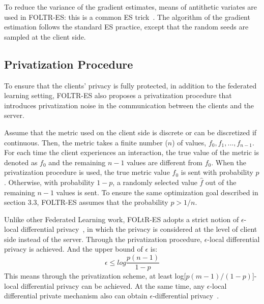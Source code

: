 To reduce the variance of the gradient estimates, means of antithetic variates are used in FOLTR-ES: this is a common ES trick~\cite{salimans2017evolution}. The algorithm of the gradient estimation follows the standard ES practice, except that the random seeds are sampled at the client side.

\subsection{Privatization Procedure}
To ensure that the clients' privacy is fully protected, in addition to the federated learning setting, FOLTR-ES also proposes a privatization procedure that introduces privatization noise in the communication between the clients and the server.

Assume that the metric used on the client side is discrete or can be discretized if continuous. Then, the metric takes a finite number ($n$) of values, $f_0, f_1, ..., f_{n-1}$. For each time the client experiences an interaction, the true value of the metric is denoted as $f_0$ and the remaining $n-1$ values are different from $f_0$. When the privatization procedure is used, the true metric value $f_0$ is sent with probability $p$. Otherwise, with probability $1-p$, a randomly selected value $\hat{f}$ out of the remaining $n-1$ values is sent. To ensure the same optimization goal described in section 3.3, FOLTR-ES assumes that the probability $p > 1/n$.

Unlike other Federated Learning work, FOLtR-ES adopts a strict notion of $\epsilon$-local differential privacy~\cite{}, in which the privacy is considered at the level of client side instead of the server. Through the privatization procedure, $\epsilon$-local differential privacy is achieved. And the upper bound of $\epsilon$ is:
\begin{equation}
	\epsilon \leq log\frac{p(n-1)}{1-p} 
\end{equation}
This means through the privatization scheme, at least log[$p(m-1)/(1-p)$]-local differential privacy can be achieved. At the same time, any $\epsilon$-local differential private mechanism also can obtain $\epsilon$-differential privacy~\cite{dwork2014algorithmic}.